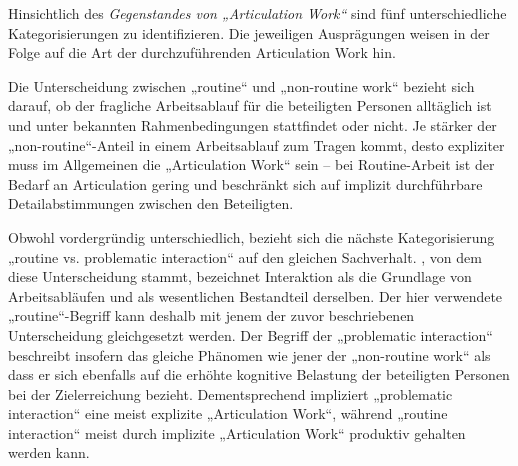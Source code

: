 Hinsichtlich des \emph{Gegenstandes von „Articulation Work“} sind fünf unterschiedliche Kategorisierungen zu identifizieren. Die jeweiligen Ausprägungen weisen in der Folge auf die Art der durchzuführenden Articulation Work hin. 

Die Unterscheidung zwischen „routine“ und „non-routine work“ bezieht sich darauf, ob der fragliche Arbeitsablauf für die beteiligten Personen alltäglich ist und unter bekannten Rahmenbedingungen stattfindet oder nicht. Je stärker der „non-routine“-Anteil in einem Arbeitsablauf zum Tragen kommt, desto expliziter muss im Allgemeinen die „Articulation Work“ sein -- bei Routine-Arbeit ist der Bedarf an Articulation gering und beschränkt sich auf implizit durchführbare Detailabstimmungen zwischen den Beteiligten. 

Obwohl vordergründig unterschiedlich, bezieht sich die nächste Kategorisierung „routine vs. problematic interaction“ auf den gleichen Sachverhalt. \citet{Strauss93}, von dem diese Unterscheidung stammt, bezeichnet Interaktion als die Grundlage von Arbeitsabläufen und als wesentlichen Bestandteil derselben. Der hier verwendete „routine“-Begriff kann deshalb mit jenem der zuvor beschriebenen Unterscheidung gleichgesetzt werden. Der Begriff der „problematic interaction“ beschreibt insofern das gleiche Phänomen wie jener der „non-routine work“ als dass er sich ebenfalls auf die erhöhte kognitive Belastung der beteiligten Personen bei der Zielerreichung bezieht. Dementsprechend impliziert „problematic interaction“ eine meist explizite „Articulation Work“, während „routine interaction“ meist durch implizite „Articulation Work“ produktiv gehalten werden kann.


